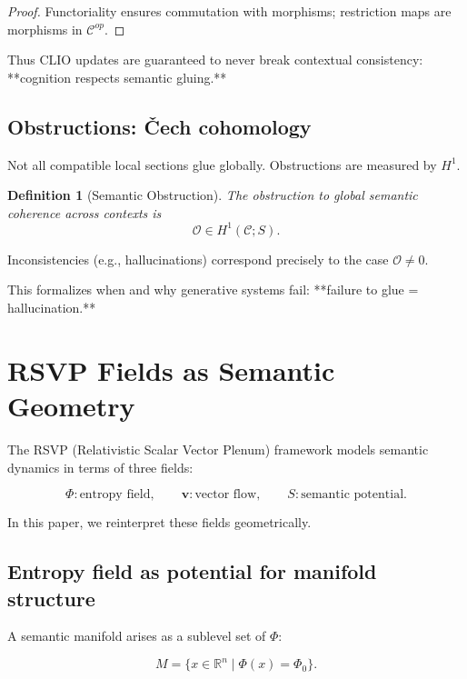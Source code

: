 \documentclass[11pt,a4paper,twocolumn]{article}
\newtheorem{definition}[theorem]{Definition}
\begin{document}
\begin{proof}
Functoriality ensures commutation with morphisms;
restriction maps are morphisms in $\mathcal{C}^{op}$.
\end{proof}

Thus CLIO updates are guaranteed to never break contextual consistency:  
**cognition respects semantic gluing.**

\subsection{Obstructions: Čech cohomology}

Not all compatible local sections glue globally.  
Obstructions are measured by $H^1$.

\begin{definition}[Semantic Obstruction]
The obstruction to global semantic coherence across contexts is
\[
\mathcal{O} \in H^1(\mathcal{C}; S).
\]
\end{definition}

Inconsistencies (e.g., hallucinations) correspond precisely to the case
$\mathcal{O} \neq 0$.

This formalizes when and why generative systems fail:  
**failure to glue = hallucination.**


\section{RSVP Fields as Semantic Geometry}

The RSVP (Relativistic Scalar Vector Plenum) framework models semantic
dynamics in terms of three fields:

\[
\Phi: \text{entropy field}, \qquad
\mathbf{v}: \text{vector flow}, \qquad
S: \text{semantic potential}.
\]

In this paper, we reinterpret these fields geometrically.

\subsection{Entropy field as potential for manifold structure}

A semantic manifold arises as a sublevel set of $\Phi$:

\[
M = \{ x \in \mathbb{R}^n \mid \Phi(x) = \Phi_0 \}.
\]
\end{document}
